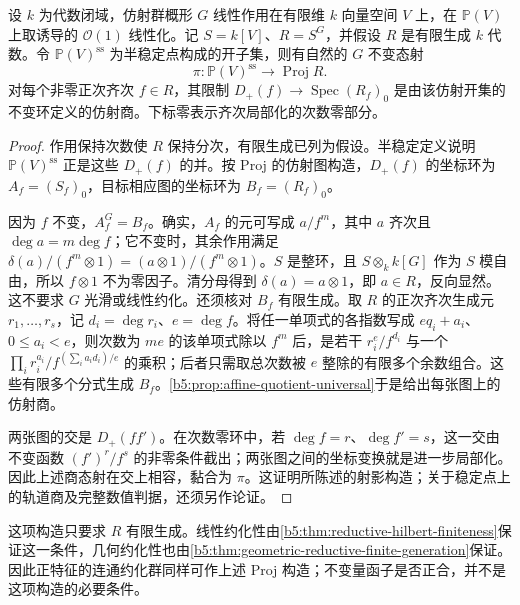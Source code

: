 \begin{proposition}\label{b5:prop:projective-invariant-quotient-construction}
	设 \(k\) 为代数闭域，仿射群概形 \(G\) 线性作用在有限维 \(k\) 向量空间 \(V\) 上，在 \(\mathbb P(V)\) 上取诱导的 \(\mathcal O(1)\) 线性化。记 \(S=k[V]\)、\(R=S^G\)，并假设 \(R\) 是有限生成 \(k\) 代数。令 \(\mathbb P(V)^{\mathrm{ss}}\) 为半稳定点构成的开子集，则有自然的 \(G\) 不变态射
	\[
		\pi:\mathbb P(V)^{\mathrm{ss}}\longrightarrow\operatorname{Proj}R.
	\]
	对每个非零正次齐次 \(f\in R\)，其限制 \(D_+(f)\to\operatorname{Spec}(R_f)_0\) 是由该仿射开集的不变环定义的仿射商。下标零表示齐次局部化的次数零部分。
\end{proposition}
\begin{proof}
	作用保持次数使 \(R\) 保持分次，有限生成已列为假设。半稳定定义说明 \(\mathbb P(V)^{\mathrm{ss}}\) 正是这些 \(D_+(f)\) 的并。按 Proj 的仿射图构造，\(D_+(f)\) 的坐标环为 \(A_f=(S_f)_0\)，目标相应图的坐标环为 \(B_f=(R_f)_0\)。

	因为 \(f\) 不变，\(A_f^G=B_f\)。确实，\(A_f\) 的元可写成 \(a/f^m\)，其中 \(a\) 齐次且 \(\deg a=m\deg f\)；它不变时，其余作用满足 \(\delta(a)/(f^m\otimes1)=(a\otimes1)/(f^m\otimes1)\)。\(S\) 是整环，且 \(S\otimes_k k[G]\) 作为 \(S\) 模自由，所以 \(f\otimes1\) 不为零因子。清分母得到 \(\delta(a)=a\otimes1\)，即 \(a\in R\)，反向显然。这不要求 \(G\) 光滑或线性约化。还须核对 \(B_f\) 有限生成。取 \(R\) 的正次齐次生成元 \(r_1,\ldots,r_s\)，记 \(d_i=\deg r_i\)、\(e=\deg f\)。将任一单项式的各指数写成 \(eq_i+a_i\)、\(0\le a_i<e\)，则次数为 \(me\) 的该单项式除以 \(f^m\) 后，是若干 \(r_i^e/f^{d_i}\) 与一个 \(\prod_i r_i^{a_i}/f^{(\sum_i a_id_i)/e}\) 的乘积；后者只需取总次数被 \(e\) 整除的有限多个余数组合。这些有限多个分式生成 \(B_f\)。\cref{b5:prop:affine-quotient-universal}于是给出每张图上的仿射商。

	两张图的交是 \(D_+(ff')\)。在次数零环中，若 \(\deg f=r\)、\(\deg f'=s\)，这一交由不变函数 \((f')^r/f^s\) 的非零条件截出；两张图之间的坐标变换就是进一步局部化。因此上述商态射在交上相容，黏合为 \(\pi\)。这证明所陈述的射影构造；关于稳定点上的轨道商及完整数值判据，还须另作论证。
\end{proof}

这项构造只要求 \(R\) 有限生成。线性约化性由\cref{b5:thm:reductive-hilbert-finiteness}保证这一条件，几何约化性也由\cref{b5:thm:geometric-reductive-finite-generation}保证。因此正特征的连通约化群同样可作上述 Proj 构造；不变量函子是否正合，并不是这项构造的必要条件。


